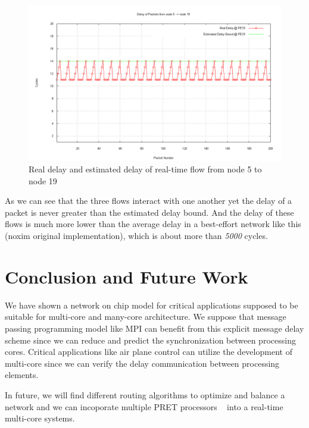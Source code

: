 \documentclass[conference, twocolumn]{IEEEtran}
\theoremstyle{definition}
\begin{document}
\begin{figure}[htp]
\centering
\includegraphics{pics/PE19.png}
\caption[Three flows example.]
{Real delay and estimated delay of real-time flow from node
5 to node 19}\label{fig:PE5PE19}
\end{figure}

As we can see that the three flows interact with one another yet the delay of a
packet is never greater than the estimated delay bound. And the delay of these
flows is much more lower than the average delay in a best-effort network like
this (noxim original implementation), which is about more than {\em 5000}
cycles.

\section{Conclusion and Future Work}
We have shown a network on chip model for critical applications supposed to be
suitable for multi-core and many-core architecture. We suppose that message
passing programming model like MPI can benefit from this explicit message
delay scheme since we can reduce and predict the synchronization between
processing cores. Critical applications like air plane control can utilize the
development of multi-core since we can verify the delay communication between
processing elements.

In future, we will find different routing algorithms to optimize and balance a
network and we can incoporate multiple PRET processors ~\cite{LicklyPRET} into
a real-time multi-core systems.



\end{document}
